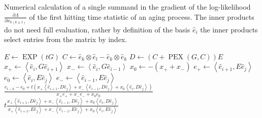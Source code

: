 \begin{algorithm}[!ht]
	\caption[Single summand of $\frac{\partial \Lambda}{\partial x_{k\left(k \pm 1\right)}}$]{Numerical calculation of a single summand in the gradient of the log-likelihood $\frac{\partial \Lambda}{\partial x_{k\left(k \pm 1\right)}}$ of the first hitting time statistic of an aging process. The inner products do not need full evaluation, rather by definition of the basis $\hat{e}_i$ the inner products select entries from the matrix by index.}
	\label{alg:singlesummand}
	\begin{algorithmic}[1]
				\State {}
			\EndIf
			\State $E \gets \operatorname{EXP}\left(t G\right)$
			\State $C \gets \hat{e}_k \otimes \hat{e}_l - \hat{e}_k \otimes \hat{e}_k$
			\State $D \gets \left(C + \operatorname{PEX}\left(G, C\right)\right)E$
			\State $x_{+} \gets \left\langle \hat{e}_i , G \hat{e}_{i+1} \right\rangle$
			\State $x_{-} \gets \left\langle \hat{e}_i , G \hat{e}_{i-1} \right\rangle$
			\State $x_0 \gets -\left(x_{+} + x_{-}\right)$
				\State $e_{+} \gets \left\langle \hat{e}_{i+1}, E \hat{e}_j \right\rangle$
				\State $e_0 \gets \left\langle \hat{e}_i, E \hat{e}_j \right\rangle$
				\State $e_{-} \gets \left\langle \hat{e}_{i-1}, E \hat{e}_j \right\rangle$
				\State \Return $\frac{e_{l-k} - e_0 + t \left(x_{+} \left\langle \hat{e}_{i+1}, D \hat{e}_j \right\rangle + x_{-} \left\langle \hat{e}_{i-1}, D \hat{e}_j \right\rangle + x_0 \left\langle \hat{e}_i, D \hat{e}_j \right\rangle\right)}{x_{+} e_{+} + x_{-}e_{-} + x_0 e_0}$
			\EndIf
			\State \Return $t \frac{ x_{+} \left\langle \hat{e}_{i+1}, D \hat{e}_j \right\rangle + x_{-} \left\langle \hat{e}_{i-1}, D \hat{e}_j \right\rangle + x_0 \left\langle \hat{e}_i, D \hat{e}_j \right\rangle}{x_{+} \left\langle \hat{e}_{i+1}, E \hat{e}_j \right\rangle + x_{-} \left\langle \hat{e}_{i-1}, E \hat{e}_j \right\rangle + x_0 \left\langle \hat{e}_i, E \hat{e}_j \right\rangle}$
		\EndFunction
	\end{algorithmic}
\end{algorithm}
